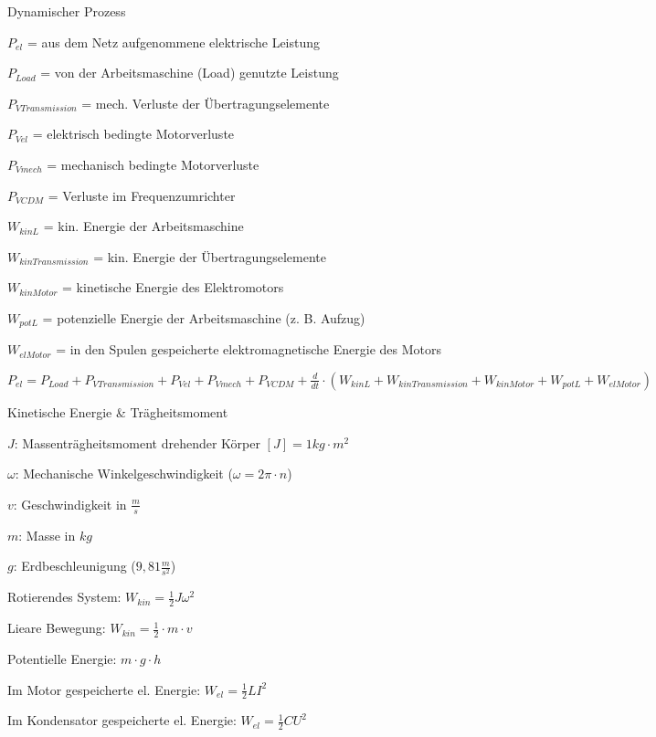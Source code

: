 \documentclass[german]{latex4ei/latex4ei_sheet}
\begin{document}
\begin{sectionbox}
			\begin{bluebox}{Dynamischer Prozess}
					\item $P_{el}$ = aus dem Netz aufgenommene elektrische Leistung
					\item $P_{Load} $ = von der Arbeitsmaschine (Load) genutzte Leistung
					\item $P_{VTransmission} $ = mech. Verluste der Übertragungselemente
					\item $P_{Vel} $ = elektrisch bedingte Motorverluste
					\item $P_{Vmech} $ = mechanisch bedingte Motorverluste
					\item $P_{VCDM} $ = Verluste im Frequenzumrichter
					\item $W_{kinL} $ = kin. Energie der Arbeitsmaschine
					\item $W_{kinTransmission} $ = kin. Energie der Übertragungselemente
					\item $W_{kinMotor} $ = kinetische Energie des Elektromotors
					\item $W_{potL} $ = potenzielle Energie der Arbeitsmaschine (z. B. Aufzug)
					\item $W_{elMotor} $ = in den Spulen gespeicherte elektromagnetische Energie des Motors
					\item $P_{el} = P_{Load} + P_{VTransmission} + P_{Vel} + P_{Vmech} + P_{VCDM} + \frac{d}{dt}\cdot (W_{kinL}+W_{kinTransmission} + W_{kinMotor} + W_{potL} + W_{elMotor})$
			\end{bluebox}
			
			\begin{symbolbox}{Kinetische Energie \& Trägheitsmoment}
				\item $J$: Massenträgheitsmoment drehender Körper $[J] = 1kg\cdot m^2$
				\item $\omega$: Mechanische Winkelgeschwindigkeit ($\omega = 2\pi \cdot n$)
				\item $v$: Geschwindigkeit in $\frac{m}{s}$
				\item $m$: Masse in $kg$
				\item $g$: Erdbeschleunigung ($9,81\frac{m}{s^2}$)
				\item Rotierendes System: \quad $W_{kin} = \frac{1}{2}J\omega^2$
				\item Lieare Bewegung: \quad $W_{kin} = \frac{1}{2} \cdot m \cdot v$
				\item Potentielle Energie: \quad $m\cdot g\cdot h$
				\item Im Motor gespeicherte el. Energie: \quad $W_{el} = \frac{1}{2}LI^2$
				\item Im Kondensator gespeicherte el. Energie: \quad $W_{el} = \frac{1}{2}CU^2$
			\end{symbolbox}
	\end{sectionbox}
\end{document}
